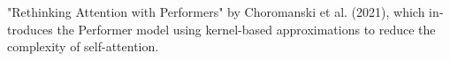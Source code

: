 \begin{latin}
	\begin{thebibliography}{9}
		"Rethinking Attention with Performers" by Choromanski et al. (2021), which introduces the Performer model using kernel-based approximations to reduce the complexity of self-attention.
	\end{thebibliography} 
\end{latin}









%
%
%
%
%
%	
